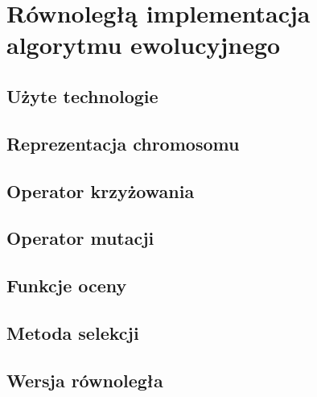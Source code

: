\chapter{Równoległą implementacja algorytmu ewolucyjnego}
\thispagestyle{chapterBeginStyle}

\section{Użyte technologie}


\section{Reprezentacja chromosomu}


\section{Operator krzyżowania}


\section{Operator mutacji}


\section{Funkcje oceny}


\section{Metoda selekcji}


\section{Wersja równoległa}
